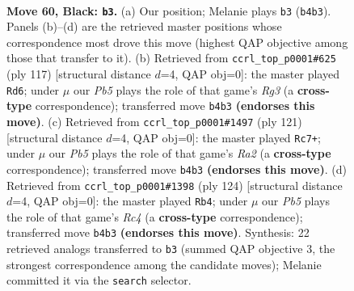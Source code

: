 \documentclass[11pt]{article}
\begin{document}
\clearpage

\begin{figure}[p]\centering
\begin{subfigure}{0.46\textwidth}\centering
\resizebox{\linewidth}{!}{%
\newchessgame
\chessboard[
  setfen={5K2/8/8/7k/1p6/r7/8/8 b - - 1 60},
  showmover=false,
  pgfstyle=straightmove, color=movearrow, markmove={b4-b3}
]}
\caption{}
\end{subfigure}\hfill
\begin{subfigure}{0.46\textwidth}\centering
\resizebox{\linewidth}{!}{%
\newchessgame
\chessboard[
  setfen={2k5/8/6r1/7R/8/8/8/2K5 b - - 19 59},
  showmover=false,
  pgfstyle=straightmove, color=movearrow, markmove={g6-d6}
]}
\caption{}
\end{subfigure}
\\[4pt]
\begin{subfigure}{0.46\textwidth}\centering
\resizebox{\linewidth}{!}{%
\newchessgame
\chessboard[
  setfen={8/r7/1R6/8/6k1/2K5/8/8 b - - 2 61},
  showmover=false,
  pgfstyle=straightmove, color=movearrow, markmove={a7-c7}
]}
\caption{}
\end{subfigure}\hfill
\begin{subfigure}{0.46\textwidth}\centering
\resizebox{\linewidth}{!}{%
\newchessgame
\chessboard[
  setfen={8/4k3/7r/8/2R5/8/8/3K4 w - - 3 63},
  showmover=false,
  pgfstyle=straightmove, color=movearrow, markmove={c4-b4}
]}
\caption{}
\end{subfigure}
\caption{\textbf{Move 60, Black: \texttt{b3}.} (a) Our position; Melanie plays \texttt{b3} (\texttt{b4b3}). Panels (b)--(d) are the retrieved master positions whose correspondence most drove this move (highest QAP objective among those that transfer to it). (b) Retrieved from \texttt{ccrl\_top\_p0001\#625} (ply 117) [structural distance $d$=4, QAP obj=0]: the master played \texttt{Rd6}; under $\mu$ our \emph{Pb5} plays the role of that game's \emph{Rg3} (a \textbf{cross-type} correspondence); transferred move \texttt{b4b3} \textbf{(endorses this move)}. (c) Retrieved from \texttt{ccrl\_top\_p0001\#1497} (ply 121) [structural distance $d$=4, QAP obj=0]: the master played \texttt{Rc7+}; under $\mu$ our \emph{Pb5} plays the role of that game's \emph{Ra2} (a \textbf{cross-type} correspondence); transferred move \texttt{b4b3} \textbf{(endorses this move)}. (d) Retrieved from \texttt{ccrl\_top\_p0001\#1398} (ply 124) [structural distance $d$=4, QAP obj=0]: the master played \texttt{Rb4}; under $\mu$ our \emph{Pb5} plays the role of that game's \emph{Rc4} (a \textbf{cross-type} correspondence); transferred move \texttt{b4b3} \textbf{(endorses this move)}. Synthesis: 22 retrieved analogs transferred to \texttt{b3} (summed QAP objective 3, the strongest correspondence among the candidate moves); Melanie committed it via the \texttt{search} selector.}
\label{fig:thought-m119}
\end{figure}
\end{document}
